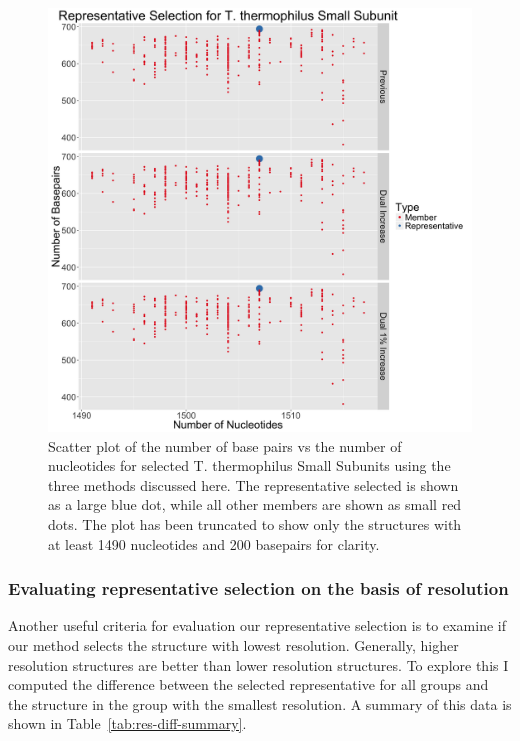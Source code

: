 \begin{figure}
  \includegraphics[width=\linewidth]{chapter-4/figs/tt-ssu-rep}
  \caption{Scatter plot of the number of base pairs vs the number of nucleotides
    for selected T. thermophilus Small Subunits using the three methods
    discussed here. The representative selected is shown as a large blue dot,
    while all other members are shown as small red dots. The plot has been
    truncated to show only the structures with at least 1490 nucleotides and 200
  basepairs for clarity.}
  \label{fig:tt-ssu-rep}
\end{figure}

\subsubsection{Evaluating representative selection on the basis of resolution}

Another useful criteria for evaluation our representative selection is to
examine if our method selects the structure with lowest resolution. Generally,
higher resolution structures are better than lower resolution structures. To
explore this I computed the difference between the selected representative for
all groups and the structure in the group with the smallest resolution. A
summary of this data is shown in Table~\ref{tab:res-diff-summary}.


